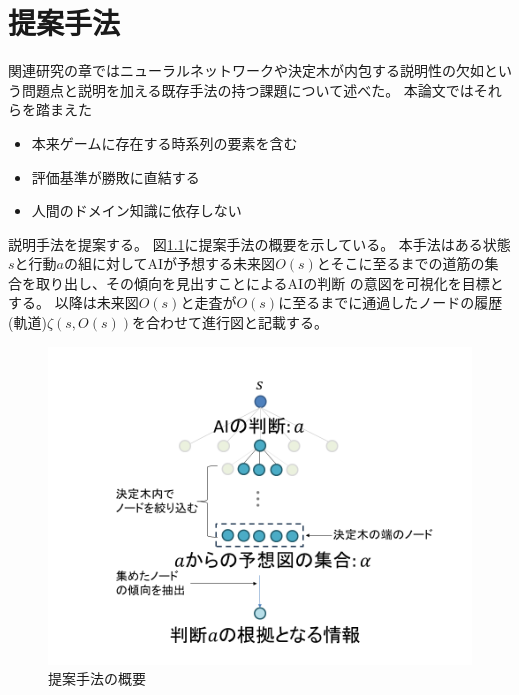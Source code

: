 \chapter{提案手法}
関連研究の章ではニューラルネットワークや決定木が内包する説明性の欠如という問題点と説明を加える既存手法の持つ課題について述べた。
本論文ではそれらを踏まえた
\begin{itemize}
	\item 本来ゲームに存在する時系列の要素を含む
	\item 評価基準が勝敗に直結する
    \item 人間のドメイン知識に依存しない
\end{itemize}
説明手法を提案する。
図\ref{fig:mabs}に提案手法の概要を示している。
本手法はある状態$s$と行動$a$の組に対してAIが予想する未来図$O(s)$とそこに至るまでの道筋の集合を取り出し、その傾向を見出すことによるAIの判断
の意図を可視化を目標とする。
以降は未来図$O(s)$と走査が$O(s)$に至るまでに通過したノードの履歴(軌道)$\zeta(s, O(s))$を合わせて進行図と記載する。
\begin{figure}[t]
    \centering
    \includegraphics[width=\linewidth]{./figure/mabs.png}
    \caption{提案手法の概要}
    \label{fig:mabs}
\end{figure}


